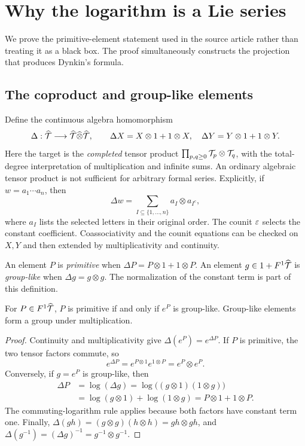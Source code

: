 \section{Why the logarithm is a Lie series}\label{sec:hopf}
We prove the primitive-element statement used in the source article rather than treating it as a black box. The proof simultaneously constructs the projection that produces Dynkin's formula.

\subsection{The coproduct and group-like elements}
Define the continuous algebra homomorphism
\begin{equation}\label{eq:coproduct}
 \Delta:\widehat{\mathcal T}\longrightarrow\widehat{\mathcal T}\widehat\otimes\widehat{\mathcal T},
 \qquad
 \Delta X=X\otimes1+1\otimes X,\quad
 \Delta Y=Y\otimes1+1\otimes Y.
\end{equation}
Here the target is the \emph{completed} tensor product
$\prod_{p,q\geq0}\mathcal T_p\otimes\mathcal T_q$, with the total-degree interpretation of multiplication and infinite sums. An ordinary algebraic tensor product is not sufficient for arbitrary formal series. Explicitly, if $w=a_1\cdots a_n$, then
\begin{equation}\label{eq:unshuffle}
 \Delta w=\sum_{I\subseteq\{1,\ldots,n\}}a_I\otimes a_{I^c},
\end{equation}
where $a_I$ lists the selected letters in their original order. The counit $\varepsilon$ selects the constant coefficient. Coassociativity and the counit equations can be checked on $X,Y$ and then extended by multiplicativity and continuity.

An element $P$ is \emph{primitive} when
$\Delta P=P\otimes1+1\otimes P$.
An element $g\in1+F^1\widehat{\mathcal T}$ is \emph{group-like} when
$\Delta g=g\otimes g$.
The normalization of the constant term is part of this definition.

\begin{proposition}\label{prop:group-like}
For $P\in F^1\widehat{\mathcal T}$, $P$ is primitive if and only if $e^P$ is group-like. Group-like elements form a group under multiplication.
\end{proposition}
\begin{proof}
Continuity and multiplicativity give $\Delta(e^P)=e^{\Delta P}$. If $P$ is primitive, the two tensor factors commute, so
\[
 e^{\Delta P}=e^{P\otimes1}e^{1\otimes P}=e^P\otimes e^P.
\]
Conversely, if $g=e^P$ is group-like, then
\begin{align*}
 \Delta P&=\log(\Delta g)
 =\log\bigl((g\otimes1)(1\otimes g)\bigr)\\
 &=\log(g\otimes1)+\log(1\otimes g)
 =P\otimes1+1\otimes P.
\end{align*}
The commuting-logarithm rule applies because both factors have constant term one. Finally,
$\Delta(gh)=(g\otimes g)(h\otimes h)=gh\otimes gh$,
and $\Delta(g^{-1})=(\Delta g)^{-1}=g^{-1}\otimes g^{-1}$.
\end{proof}

